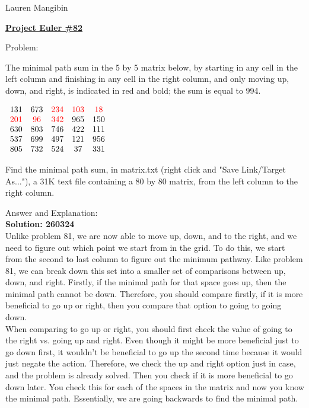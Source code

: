 \documentclass{article}
\begin{document}
\begin{flushright}
Lauren Mangibin
\end{flushright}

\begin{center}
    \underline{\textbf{Project Euler \#82}}
\end{center}

Problem:

The minimal path sum in the 5 by 5 matrix below, by starting in any cell in the left column and finishing in any cell in the right column, and only moving up, down, and right, is indicated in red and bold; the sum is equal to 994.
\begin{center}
    $\begin{array}{cccccc}
131&673&\textcolor{red}{234}&\textcolor{red}{103}&\textcolor{red}{18}\\
\textcolor{red}{201}&\textcolor{red}{96}&\textcolor{red}{342}&965&150\\
630&803&746&422&111\\
537&699&497&121&956\\
805&732&524&37&331\\
\end{array}$

\end{center}

Find the minimal path sum, in matrix.txt (right click and "Save Link/Target As..."), a 31K text file containing a 80 by 80 matrix, from the left column to the right column.


Answer and Explanation:\\
\textbf{Solution: 260324}\\
Unlike problem 81, we are now able to move up, down, and to the right, and we need to figure out which point we start from in the grid. To do this, we start from the second to last column to figure out the minimum pathway. Like problem 81, we can break down this set into a smaller set of comparisons between up, down, and right. Firstly, if the minimal path for that space goes up, then the minimal path cannot be down. Therefore, you should compare firstly, if it is more beneficial to go up or right, then you compare that option to going to going down.\\

When comparing to go up or right, you should first check the value of going to the right vs. going up and right. Even though it might be more beneficial just to go down first, it wouldn't be beneficial to go up the second time because it would just negate the action. Therefore, we check the up and right option just in case, and the problem is already solved. Then you check if it is more beneficial to go down later. You check this for each of the spaces in the matrix and now you know the minimal path. Essentially, we are going backwards to find the minimal path.
\end{document}
